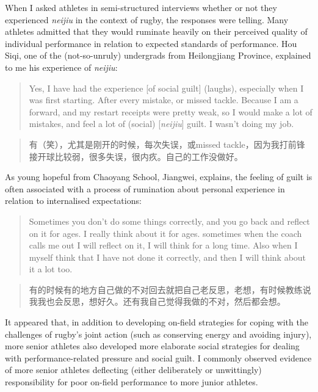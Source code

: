 \begin{CJK}{UTF8}{gbsn}
When I asked athletes in semi-structured interviews whether or not they experienced \textit{neijiu} in the context of rugby, the responses were telling.  Many athletes admitted that they would ruminate heavily on their perceived quality of individual performance in relation to expected standards of performance.  Hou Siqi, one of the (not-so-unruly) undergrads from Heilongjiang Province, explained to me his experience of \textit{neijiu}:

      \begin{quote}
        Yes, I have had the experience [of social guilt] (laughs), especially when I was first starting. After every mistake, or missed tackle.  Because I am a forward, and my restart receipts were pretty weak, so I would make a lot of mistakes, and feel a lot of (social) [\textit{neijiu}] guilt.  I wasn't doing my job.
      \end{quote}

      \begin{quote}
        有（笑），尤其是刚开的时候，每次失误，或missed tackle，因为我打前锋 接开球比较弱，很多失误，很内疚。自己的工作没做好。
      \end{quote}

As young hopeful from Chaoyang School, Jiangwei, explains, the feeling of guilt is often associated with a process of rumination about personal experience in relation to internalised expectations:

      \begin{quote}
        Sometimes you don't do some things correctly, and you go back and reflect on it for ages. I really think about it for ages. sometimes when the coach calls me out I will reflect on it, I will think for a long time. Also when I myself think that I have not done it correctly, and then I will think about it a lot too.
      \end{quote}

      \begin{quote}
        有的时候有的地方自己做的不对回去就把自己老反思，老想，有时候教练说我我也会反思，想好久。还有我自己觉得我做的不对，然后都会想。
      \end{quote}







It appeared that, in addition to developing on-field strategies for coping with the challenges of rugby’s joint action (such as conserving energy and avoiding injury), more senior athletes also developed more elaborate social strategies for dealing with performance-related pressure and social guilt.  I commonly observed evidence of more senior athletes deflecting (either deliberately or unwittingly) responsibility for poor on-field performance to more junior athletes.


\end{CJK}
